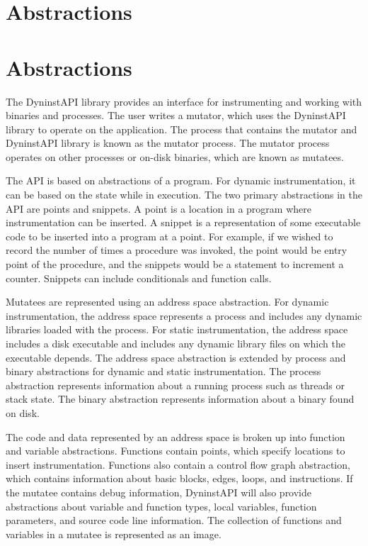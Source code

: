 \section{Abstractions}

\clearpage\section{Abstractions}
The DyninstAPI library provides an interface for instrumenting and working with binaries and processes. The user
writes a mutator, which uses the DyninstAPI library to operate on the application. The process that contains the
mutator and DyninstAPI library is known as the mutator process. The mutator process operates on other processes or
on-disk binaries, which are known as mutatees.

The API is based on abstractions of a program. For dynamic instrumentation, it can be based on the state while in
execution. The two primary abstractions in the API are points and snippets. A point is a location in a program
where instrumentation can be inserted. A snippet is a representation of some executable code to be inserted into a
program at a point. For example, if we wished to record the number of times a procedure was invoked, the point would
be entry point of the procedure, and the snippets would be a statement to increment a counter. Snippets can include
conditionals and function calls.

Mutatees are represented using an address space abstraction. For dynamic instrumentation, the address space represents
a process and includes any dynamic libraries loaded with the process. For static instrumentation, the address space
includes a disk executable and includes any dynamic library files on which the executable depends. The address space
abstraction is extended by process and binary abstractions for dynamic and static instrumentation. The process
abstraction represents information about a running process such as threads or stack state. The binary abstraction
represents information about a binary found on disk.

The code and data represented by an address space is broken up into function and variable abstractions. Functions
contain points, which specify locations to insert instrumentation. Functions also contain a control flow graph
abstraction, which contains information about basic blocks, edges, loops, and instructions. If the mutatee contains
debug information, DyninstAPI will also provide abstractions about variable and function types, local variables,
function parameters, and source code line information. The collection of functions and variables in a mutatee is
represented as an image.

